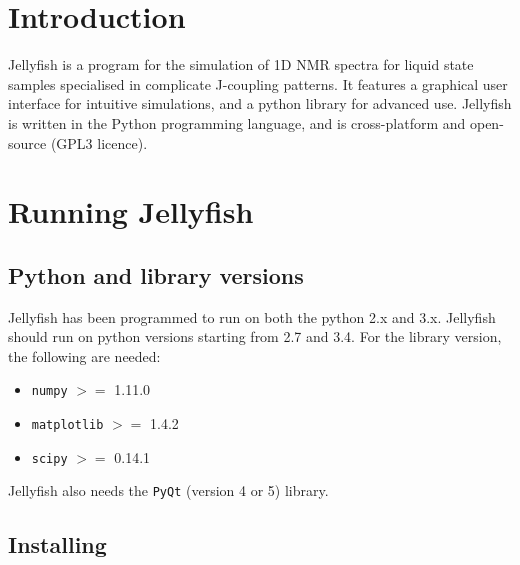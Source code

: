 \documentclass[11pt,a4paper]{article}
\renewcommand\cfttoctitlefont{\color{black!70}\Huge\fontfamily{SourceSansPro-LF}\bfseries}
\begin{document}


\thispagestyle{empty}
\newpage
\mbox{}


\renewcommand\cfttoctitlefont{\color{black}\Huge\fontfamily{SourceSansPro-LF}\bfseries}
\setcounter{tocdepth}{2}
\tableofcontents %

\renewcommand\cfttoctitlefont{\color{black!70}\Huge\fontfamily{SourceSansPro-LF}\bfseries}


\section{Introduction}
Jellyfish is a program for the simulation of 1D NMR spectra for liquid state samples specialised in
complicate J-coupling patterns. It features a graphical user interface for intuitive simulations,
and a python library for advanced use. Jellyfish is written in the Python programming
language, and is cross-platform and open-source (GPL3 licence).



\section{Running Jellyfish}
\subsection{Python and library versions}
Jellyfish has been programmed to run on both the python 2.x and 3.x. Jellyfish should run on python
versions starting from 2.7 and 3.4.
For the library version, the following are needed:
\begin{itemize}
  \item  \texttt{numpy} $>=$ 1.11.0
  \item  \texttt{matplotlib} $>=$ 1.4.2
  \item  \texttt{scipy} $>=$ 0.14.1
\end{itemize}
Jellyfish also needs the \texttt{PyQt} (version 4 or 5) library.

\subsection{Installing}
\end{document}
